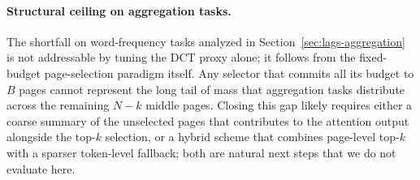 \paragraph{Structural ceiling on aggregation tasks.}
The shortfall on word-frequency tasks analyzed in
Section~\ref{sec:lags-aggregation} is not addressable by tuning the
DCT proxy alone; it follows from the fixed-budget page-selection
paradigm itself.  Any selector that commits all its budget to $B$
pages cannot represent the long tail of mass that aggregation tasks
distribute across the remaining $N - k$ middle pages.  Closing this
gap likely requires either a coarse summary of the unselected pages
that contributes to the attention output alongside the top-$k$
selection, or a hybrid scheme that combines page-level top-$k$ with a
sparser token-level fallback; both are natural next steps that we do
not evaluate here.
